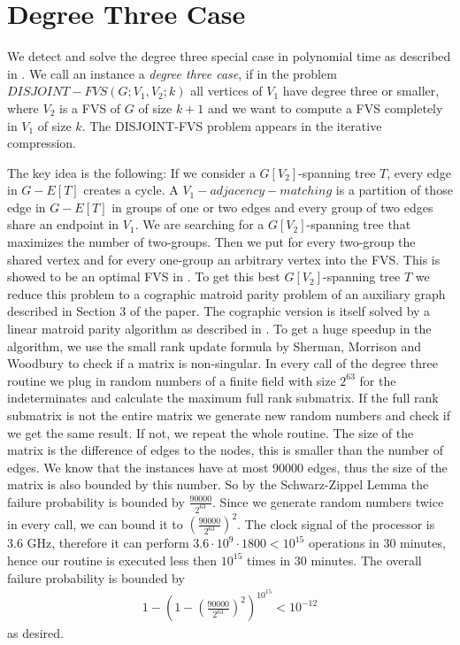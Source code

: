 \documentclass[11pt,a4paper]{scrartcl}
\begin{document}
\section{Degree Three Case}

We detect and solve the degree three special case in polynomial time as described in \cite{DBLP:journals/corr/abs-1004-1672}. We call an instance a \textit{degree three case}, if in the problem $DISJOINT-FVS(G; V_1, V_2; k)$ all vertices of $V_1$ have degree three or smaller, where $V_2$ is a FVS of $G$ of size $k+1$ and we want to compute a FVS completely in $V_1$ of size $k$. The DISJOINT-FVS problem appears in the iterative compression.


The key idea is the following: If we consider a $G[V_2]$-spanning tree $T$, every edge in $G - E[T]$ creates a cycle. A $V_1-adjacency-matching$ is a partition of those edge in $G - E[T]$ in groups of one or two edges and every group of two edges share an endpoint in $V_1$. We are searching for a $G[V_2]$-spanning tree that maximizes the number of two-groups. Then we put for every two-group the shared vertex and for every one-group an arbitrary vertex into the FVS. This is showed to be an optimal FVS in \cite{DBLP:journals/corr/abs-1004-1672}. To get this best $G[V_2]$-spanning tree $T$ we reduce this problem to a cographic matroid parity problem of an auxiliary graph described in Section 3 of the paper. The cographic version is itself solved by a linear matroid parity algorithm as described in \cite{Cheung:2014:AAL:2620785.2601066}. To get a huge speedup in the algorithm, we use the small rank update formula by Sherman, Morrison and Woodbury to check if a matrix is non-singular.
In every call of the degree three routine we plug in random numbers of a finite field with size $2^{63}$ for the indeterminates and calculate the maximum full rank submatrix. If the full rank submatrix is not the entire matrix we generate new random numbers and check if we get the same result. If not, we repeat the whole routine. The size of the matrix is the difference of edges to the nodes, this is smaller than the number of edges. We know that the instances have at most 90000 edges, thus the size of the matrix is also bounded by this number. So by the Schwarz-Zippel Lemma the failure probability is bounded by $\frac{90000}{2^{63}}$. Since we generate random numbers twice in every call, we can bound it to $(\frac{90000}{2^{63}})^2$. The clock signal of the processor is 3.6 GHz, therefore it can perform $3.6\cdot 10^9\cdot 1800<10^{15}$ operations in 30 minutes, hence our routine is executed less then $10^{15}$ times in 30 minutes. The overall failure probability is bounded by
\begin{align*}
1-\left(1-\left(\frac{90000}{2^{63}}\right)^2\right)^{10^{15}}<10^{-12}
\end{align*}
as desired.

\nocite{bafna1999}
\nocite{chen2008}


\end{document}
